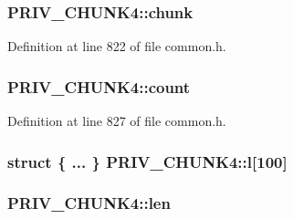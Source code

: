 \subsubsection[{\texorpdfstring{chunk}{chunk}}]{ P\+R\+I\+V\+\_\+\+C\+H\+U\+N\+K4\+::chunk}\hypertarget{struct_p_r_i_v___c_h_u_n_k4_a76248fdb060bc9f9a0ce334866284199}{}\label{struct_p_r_i_v___c_h_u_n_k4_a76248fdb060bc9f9a0ce334866284199}


Definition at line 822 of file common.\+h.

\subsubsection[{\texorpdfstring{count}{count}}]{ P\+R\+I\+V\+\_\+\+C\+H\+U\+N\+K4\+::count}\hypertarget{struct_p_r_i_v___c_h_u_n_k4_ad526a2b64e94930cbf28cd7f65c856f5}{}\label{struct_p_r_i_v___c_h_u_n_k4_ad526a2b64e94930cbf28cd7f65c856f5}


Definition at line 827 of file common.\+h.

\subsubsection[{\texorpdfstring{l}{l}}]{\setlength{\rightskip}{0pt plus 5cm}struct \{ ... \}   P\+R\+I\+V\+\_\+\+C\+H\+U\+N\+K4\+::l\mbox{[}100\mbox{]}}\hypertarget{struct_p_r_i_v___c_h_u_n_k4_ac581347d158ac354b6d029ddde29dd27}{}\label{struct_p_r_i_v___c_h_u_n_k4_ac581347d158ac354b6d029ddde29dd27}
\subsubsection[{\texorpdfstring{len}{len}}]{ P\+R\+I\+V\+\_\+\+C\+H\+U\+N\+K4\+::len}\hypertarget{struct_p_r_i_v___c_h_u_n_k4_ac75f24f4ec5ffd8629f200b02df90d30}{}\label{struct_p_r_i_v___c_h_u_n_k4_ac75f24f4ec5ffd8629f200b02df90d30}


